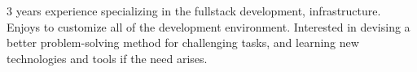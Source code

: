 

\begin{cvparagraph}

3 years experience specializing in the fullstack development, infrastructure. Enjoys to customize all of the development environment. Interested in devising a better problem-solving method for challenging tasks, and learning new technologies and tools if the need arises.
\end{cvparagraph}
